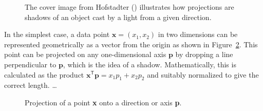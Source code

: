 \documentclass[
  letterpaper,
  10pt,
  krantz2]{krantz}
\begin{document}
\begin{figure}


\caption{\label{fig-cover-GBE}The cover image from Hofstadter
() illustrates how projections are
shadows of an object cast by a light from a given direction.}

\end{figure}%

In the simplest case, a data point \(\mathbf{x} = (x_1, x_2)\) in two
dimensions can be represented geometrically as a vector from the origin
as shown in Figure~\ref{fig-projection}. This point can be projected on
any one-dimensional axis \(\mathbf{p}\) by dropping a line perpendicular
to \(\mathbf{p}\), which is the idea of a shadow. Mathematically, this
is calculated as the product
\(\mathbf{x}^\mathsf{T} \mathbf{p} = x_1 p_1 + x_2 p_2\) and suitably
normalized to give the correct length. \ldots{}

\begin{figure}


\caption{\label{fig-projection}Projection of a point \textbf{x} onto a
direction or axis \textbf{p}.}

\end{figure}%
\end{document}
